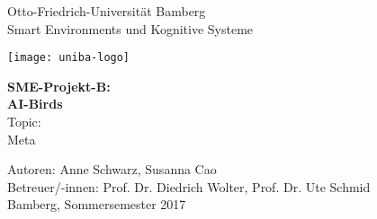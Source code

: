 \begin{titlepage}
\begin{center}
\hbox{}
\vskip 3cm
\textsf{\scriptsize{Otto-Friedrich-Universität Bamberg}}\\
\vskip 5mm
\textsf{\footnotesize{Smart Environments und Kognitive Systeme}}
\vskip 3mm

\vspace{3mm}
\begin{center}
	\texttt{[image: uniba-logo]}
\end{center}
\vspace{3mm}
\vskip 8mm
\textsf{{\textbf{SME-Projekt-B:\\ AI-Birds}}}\\
\vskip 16mm
\textsf{\normalsize{Topic:}}\\
\vskip 8mm
\textsf{\Large{Meta}}\\
\vskip 40mm
\end{center}
\textsf{\normalsize{Autoren: Anne Schwarz, Susanna Cao}}\\
\textsf{\normalsize{Betreuer/-innen: Prof. Dr. Diedrich Wolter, Prof. Dr. Ute Schmid}}\\
\textsf{\normalsize{Bamberg, Sommersemester 2017}}\\
\vfill
\end{titlepage}
